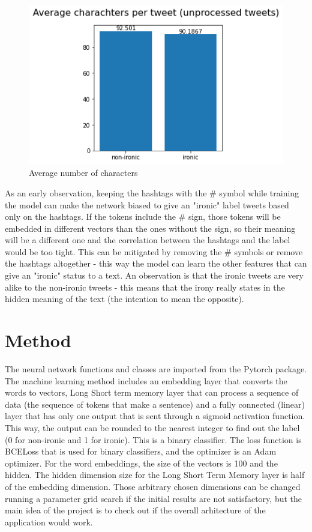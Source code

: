 \documentclass[11pt]{article}
\begin{document}
\begin{figure}[h!]
    \begin{center}
  \includegraphics[width=\columnwidth]{avg_chars}

  \caption{Average number of characters}\label{fig:figure11}
        \end{center}
\end{figure}



  As an early observation, keeping the hashtags with the \# symbol while training the model can make the network biased to give an "ironic" label tweets based only on the hashtags.
If the tokens include the \# sign, those tokens will be embedded in different vectors than the ones without the sign, so their meaning will be a different one and the correlation between the hashtags and the label would be too tight.
  This can be mitigated by removing the \# symbols or remove the hashtags altogether - this way the model can learn the other features that can give an "ironic" status to a text.
An observation is that the ironic tweets are very alike to the non-ironic tweets - this means that the irony really states in the hidden meaning of the text (the intention to mean the opposite).

  \section{Method}\label{sec:method}
The neural network functions and classes are imported from the Pytorch package.
  The machine learning method includes an embedding layer that converts the words to vectors, Long Short term memory layer that can process a sequence of data (the sequence of tokens that make a sentence) and a fully connected (linear) layer that has only one output that is sent through a sigmoid activation function.
  This way, the output can be rounded to the nearest integer to find out the label (0 for non-ironic and 1 for ironic).
  This is a binary classifier.
  The loss function is BCELoss that is used for binary classifiers, and the optimizer is an Adam optimizer.
For the word embeddings, the size of the vectors is 100 and the hidden.
The hidden dimension size for the Long Short Term Memory layer is half of the embedding dimension.
Those arbitrary chosen dimensions can be changed running a parameter grid search if the initial results are not satisfactory, but the main idea of the project is to check out if the overall arhitecture of the application would work.
\end{document}
